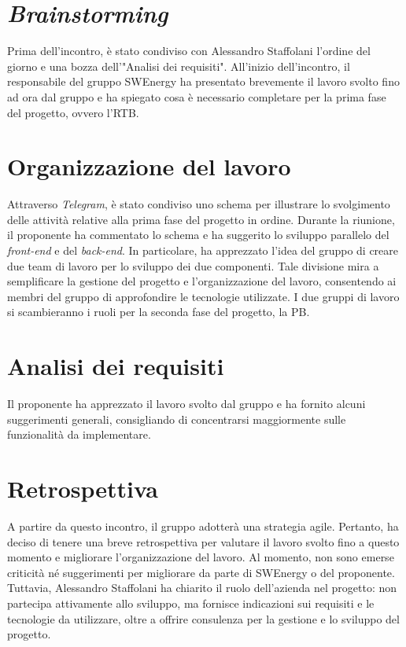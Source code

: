 \section{\textit{Brainstorming}}

Prima dell'incontro, è stato condiviso con Alessandro Staffolani l'ordine del giorno e 
una bozza dell'"Analisi dei requisiti". All'inizio dell'incontro, il 
responsabile del gruppo SWEnergy ha presentato brevemente il lavoro svolto 
fino ad ora dal gruppo e ha spiegato cosa è necessario completare per la prima 
fase del progetto, ovvero l'RTB.

\section{Organizzazione del lavoro}

Attraverso \textit{Telegram}, è stato condiviso uno schema per illustrare lo 
svolgimento delle attività relative alla prima fase del progetto in ordine. 
Durante la riunione, il proponente ha commentato lo schema e ha suggerito lo 
sviluppo parallelo del \textit{front-end} e del \textit{back-end}. In 
particolare, ha apprezzato l'idea del gruppo di creare due team di lavoro per lo 
sviluppo dei due componenti. Tale divisione mira a semplificare la gestione del 
progetto e l'organizzazione del lavoro, consentendo ai membri del gruppo di 
approfondire le tecnologie utilizzate. I due gruppi di lavoro si scambieranno 
i ruoli per la seconda fase del progetto, la PB.

\section{Analisi dei requisiti}

Il proponente ha apprezzato il lavoro svolto dal gruppo e ha fornito alcuni 
suggerimenti generali, consigliando di concentrarsi maggiormente sulle 
funzionalità da implementare.

\section{Retrospettiva}

A partire da questo incontro, il gruppo adotterà una strategia agile. Pertanto, 
ha deciso di tenere una breve retrospettiva per valutare il lavoro svolto fino a 
questo momento e migliorare l'organizzazione del lavoro. Al momento, non sono 
emerse criticità né suggerimenti per migliorare da parte di SWEnergy o del 
proponente. Tuttavia, Alessandro Staffolani ha chiarito il ruolo dell'azienda nel 
progetto: non partecipa attivamente allo sviluppo, ma fornisce indicazioni sui 
requisiti e le tecnologie da utilizzare, oltre a offrire consulenza per la 
gestione e lo sviluppo del progetto.

